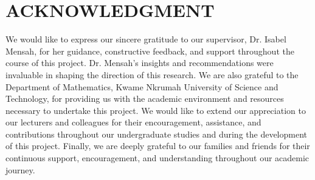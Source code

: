 \chapter*{ACKNOWLEDGMENT}
We would like to express our sincere gratitude to our supervisor, Dr. Isabel Mensah, for her guidance, constructive feedback, and support throughout the course of this project. Dr. Mensah's insights 
and recommendations were invaluable in shaping the direction of this research.
We are also grateful to the Department of Mathematics, Kwame Nkrumah University of Science and Technology, for providing us with the academic environment and resources necessary to undertake this project.
We would like to extend our appreciation to our lecturers and colleagues for their encouragement, assistance, and contributions throughout our undergraduate studies and during the development of this project.
Finally, we are deeply grateful to our families and friends for their continuous support, encouragement, and understanding throughout our academic journey.

